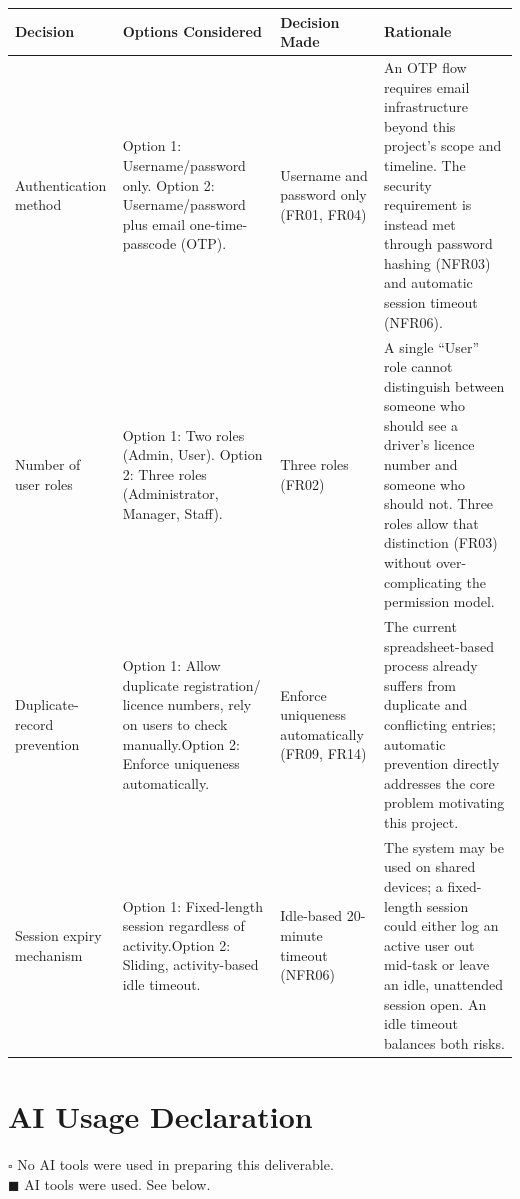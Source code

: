 \documentclass[11pt,a4paper]{article}
\begin{document}
\begin{longtable}{@{}p{2.6cm}p{4.0cm}p{3.0cm}p{5.7cm}@{}}
\toprule
Decision & Options Considered & Decision Made & Rationale \\
\midrule
\endhead
Authentication method & Option 1: Username/password only.\newline
Option 2: Username/password plus email one-time-passcode (OTP). &
Username and password only (FR01, FR04) & An OTP flow requires email
infrastructure beyond this project's scope and timeline. The security
requirement is instead met through password hashing (NFR03) and
automatic session timeout (NFR06). \\
Number of user roles & Option 1: Two roles (Admin, User).\newline
Option 2: Three roles (Administrator, Manager, Staff). & Three roles
(FR02) & A single ``User'' role cannot distinguish between someone who
should see a driver's licence number and someone who should not. Three
roles allow that distinction (FR03) without over-complicating the
permission model. \\
Duplicate-record prevention & Option 1: Allow duplicate registration/
licence numbers, rely on users to check manually.\newline Option 2:
Enforce uniqueness automatically. & Enforce uniqueness automatically
(FR09, FR14) & The current spreadsheet-based process already suffers
from duplicate and conflicting entries; automatic prevention directly
addresses the core problem motivating this project. \\
Session expiry mechanism & Option 1: Fixed-length session regardless of
activity.\newline Option 2: Sliding, activity-based idle timeout. &
Idle-based 20-minute timeout (NFR06) & The system may be used on shared
devices; a fixed-length session could either log an active user out
mid-task or leave an idle, unattended session open. An idle timeout
balances both risks. \\
\bottomrule
\end{longtable}


\section{AI Usage Declaration}

$\square$ No AI tools were used in preparing this deliverable.\\
$\blacksquare$ AI tools were used. See below.
\end{document}
